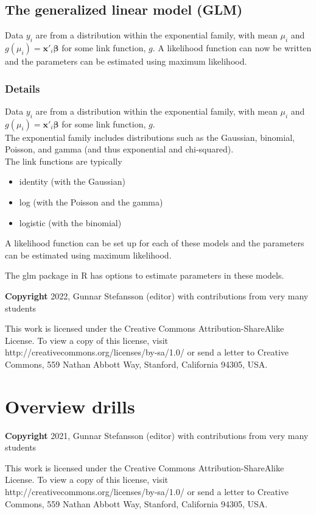\documentclass[12pt,a4paper]{article}
\theoremstyle{regla}
\theoremstyle{remark}
\theoremstyle{definition}
\theoremstyle{nonumberbreak}
\begin{document}
\subsection{The generalized linear model (GLM)}
\begin{fbox}
\begin{minipage}{0.97\textwidth}
Data $y_i$ are from a distribution within the exponential family, with mean $\mu_i$ and $g(\mu_i)=\textbf{x}'_i\boldsymbol{\beta}$ for some link function, $g$. A likelihood function can now be written and the parameters can be estimated using maximum likelihood.



\end{minipage}
\end{fbox}
\subsubsection{Details}
Data $y_i$ are from a distribution within the exponential family, with mean $\mu_i$ and $g(\mu_i)=\textbf{x}'_i\boldsymbol{\beta}$ for some link function, $g$.\\

The exponential family includes distributions such as the Gaussian, binomial, Poisson, and gamma (and thus exponential and chi-squared).\\  

The link functions are typically 
\begin{itemize}
\item identity (with the Gaussian)
\item log (with the Poisson and the gamma)
\item logistic (with the binomial)
\end{itemize}

A likelihood function can be set up for each of these models and the parameters can be estimated using maximum likelihood.

The glm package in R has options to estimate parameters in these models.




{\bf Copyright}
2022, Gunnar Stefansson (editor) with contributions from very many students

This work is licensed under the Creative Commons
Attribution-ShareAlike License. To view a copy of this license, visit
http://creativecommons.org/licenses/by-sa/1.0/ or send a letter to
Creative Commons, 559 Nathan Abbott Way, Stanford, California 94305,
USA.
\clearpage
\section{Overview drills}
{\bf Copyright}
2021, Gunnar Stefansson (editor) with contributions from very many students

This work is licensed under the Creative Commons
Attribution-ShareAlike License. To view a copy of this license, visit
http://creativecommons.org/licenses/by-sa/1.0/ or send a letter to
Creative Commons, 559 Nathan Abbott Way, Stanford, California 94305,
USA.
\clearpage
\end{document}
